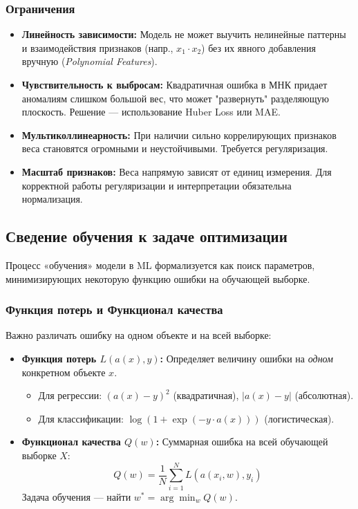 \documentclass[12pt]{article}
\begin{document}
\subsubsection{Ограничения}
\begin{itemize}
    \item \textbf{Линейность зависимости:} Модель не может выучить нелинейные паттерны и взаимодействия признаков (напр., $x_1 \cdot x_2$) без их явного добавления вручную (\textit{Polynomial Features}).
    \item \textbf{Чувствительность к выбросам:} Квадратичная ошибка в МНК придает аномалиям слишком большой вес, что может "развернуть" разделяющую плоскость. Решение — использование Huber Loss или MAE.
    \item \textbf{Мультиколлинеарность:} При наличии сильно коррелирующих признаков веса становятся огромными и неустойчивыми. Требуется регуляризация.
    \item \textbf{Масштаб признаков:} Веса напрямую зависят от единиц измерения. Для корректной работы регуляризации и интерпретации обязательна нормализация.
\end{itemize}

\subsection{Сведение обучения к задаче оптимизации}
Процесс «обучения» модели в ML формализуется как поиск параметров, минимизирующих некоторую функцию ошибки на обучающей выборке.

\subsubsection{Функция потерь и Функционал качества}
Важно различать ошибку на одном объекте и на всей выборке:
\begin{itemize}
    \item \textbf{Функция потерь $L(a(x), y)$:} Определяет величину ошибки на \textit{одном} конкретном объекте $x$. 
    \begin{itemize}
        \item Для регрессии: $(a(x) - y)^2$ (квадратичная), $|a(x) - y|$ (абсолютная).
        \item Для классификации: $\log(1 + \exp(-y \cdot a(x)))$ (логистическая).
    \end{itemize}
    \item \textbf{Функционал качества $Q(w)$:} Суммарная ошибка на всей обучающей выборке $X$:
    \[ Q(w) = \frac{1}{N} \sum_{i=1}^N L(a(x_i, w), y_i) \]
    Задача обучения — найти $w^* = \arg\min_w Q(w)$.
\end{itemize}
\end{document}
